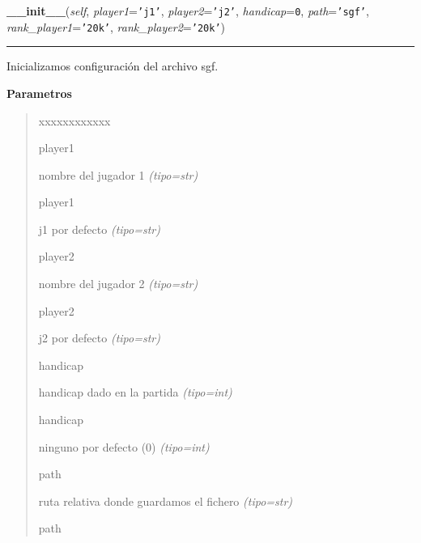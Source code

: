 \hspace{.8\funcindent}\begin{boxedminipage}{\funcwidth}

    \raggedright \textbf{\_\_init\_\_}(\textit{self}, \textit{player1}={\tt \texttt{'}\texttt{j1}\texttt{'}}, \textit{player2}={\tt \texttt{'}\texttt{j2}\texttt{'}}, \textit{handicap}={\tt 0}, \textit{path}={\tt \texttt{'}\texttt{sgf}\texttt{'}}, \textit{rank\_player1}={\tt \texttt{'}\texttt{20k}\texttt{'}}, \textit{rank\_player2}={\tt \texttt{'}\texttt{20k}\texttt{'}})

    \vspace{-1.5ex}

    \rule{\textwidth}{0.5\fboxrule}
\setlength{\parskip}{2ex}
Inicializamos configuración del archivo sgf.

\setlength{\parskip}{1ex}
      \textbf{Parametros}
      \vspace{-1ex}

      \begin{quote}
        \begin{Ventry}{xxxxxxxxxxxx}

          \item[player1]


nombre del jugador 1
            {\it (tipo=str)}

          \item[player1]


j1 por defecto
            {\it (tipo=str)}

          \item[player2]


nombre del jugador 2
            {\it (tipo=str)}

          \item[player2]


j2 por defecto
            {\it (tipo=str)}

          \item[handicap]


handicap dado en la partida
            {\it (tipo=int)}

          \item[handicap]


ninguno por defecto (0)
            {\it (tipo=int)}

          \item[path]


ruta relativa donde guardamos el fichero
            {\it (tipo=str)}

          \item[path]



\end{Ventry}
\end{quote}
\end{boxedminipage}
